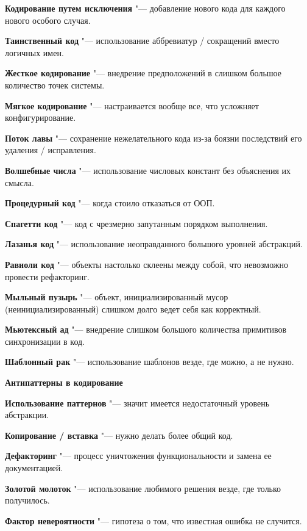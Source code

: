 \documentclass[bachelor, och, pract]{SCWorks}
\theoremstyle{remark}
\begin{document}
    \textbf{Кодирование путем исключения} "--- добавление нового кода для каждого нового особого случая.
    
    \textbf{Таинственный код} "--- использование аббревиатур / сокращений вместо логичных имен.
    
    \textbf{Жесткое кодирование} "--- внедрение предположений в слишком большое количество точек системы.
    
    \textbf{Мягкое кодирование} "--- настраивается вообще все, что усложняет конфигурирование.
    
    \textbf{Поток лавы} "--- сохранение нежелательного кода из-за боязни последствий его удаления / исправления.
    
    \textbf{Волшебные числа} "--- использование числовых констант без объяснения их смысла.
    
    \textbf{Процедурный код} "--- когда стоило отказаться от ООП.
    
    \textbf{Спагетти код} "--- код с чрезмерно запутанным порядком выполнения.
    
    \textbf{Лазанья код} "--- использование неоправданного большого уровней абстракций.
    
    \textbf{Равиоли код} "--- объекты настолько склеены между собой, что невозможно провести рефакторинг.
    
    \textbf{Мыльный пузырь} "--- объект, инициализированный мусор (неинициализированный) слишком долго ведет себя как корректный.

    \textbf{Мьютексный ад} "--- внедрение слишком большого количества примитивов синхронизации в код. 
    
    \textbf{Шаблонный рак} "--- использование шаблонов везде, где можно, а не нужно.



    \begin{center}
        \textbf{Антипаттерны в кодирование}
    \end{center}

    \textbf{Использование паттернов} "--- значит имеется недостаточный уровень абстракции.

    \textbf{Копирование / вставка} "--- нужно делать более общий код.

    \textbf{Дефакторинг} "--- процесс уничтожения функциональности и замена ее документацией.

    \textbf{Золотой молоток} "--- использование любимого решения везде, где только получилось.

    \textbf{Фактор невероятности} "--- гипотеза о том, что известная ошибка не случится.
\end{document}
